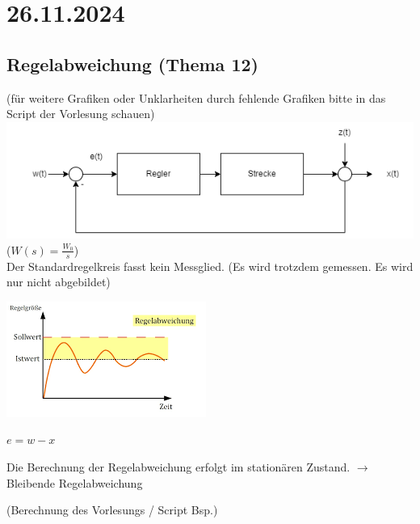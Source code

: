 \documentclass{article}
\begin{document}
\newpage
\section*{26.11.2024}
\subsection*{Regelabweichung (Thema 12)}
(für weitere Grafiken oder Unklarheiten durch fehlende Grafiken bitte in das Script der Vorlesung schauen) \\
\includegraphics[width=\textwidth]{2024_11_26_standard_regelkreis.png}
($W(s) = \frac{W_0}{s}$) \\
Der Standardregelkreis fasst kein Messglied. (Es wird trotzdem gemessen. Es wird nur nicht abgebildet) \\
\begin{multicols}{2}
	\includegraphics{2024_11_26_regelabweichung.png}

	\columnbreak
	
	\begin{center} $e = w - x$ \end{center}
	Die Berechnung der Regelabweichung erfolgt im stationären Zustand. $\to $ Bleibende Regelabweichung
\end{multicols}
\vspace{1em}
(Berechnung des Vorlesungs / Script Bsp.)
\end{document}
